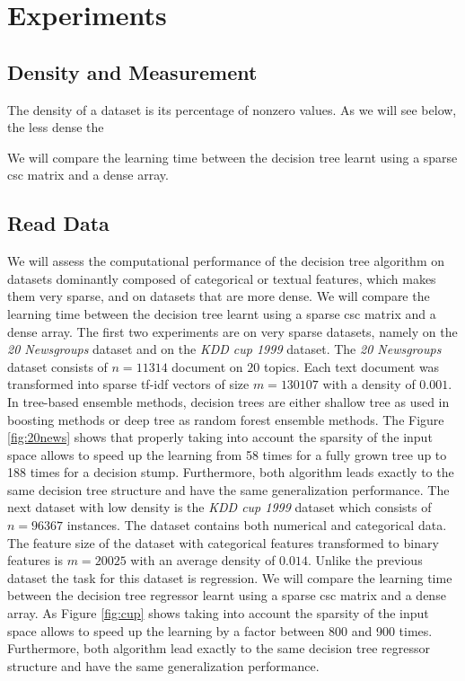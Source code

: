 \section{Experiments} \label{sec:experiments}
\subsection{Density and Measurement}

The density of a dataset is its percentage of nonzero values. As we will see below, the less dense the 

We will compare the learning time between the decision tree learnt
using a sparse csc matrix and a dense array.

\subsection{Read Data}

We will assess the computational performance of the decision tree algorithm on datasets dominantly composed of categorical or textual features, which makes them very sparse, and on datasets that are more dense. We will compare the learning time between the decision tree learnt
using a sparse csc matrix and a dense array.
The first two experiments are on very sparse datasets, namely on the \emph{20 Newsgroups} dataset \cite{joachims1996probabilistic} and on the \emph{KDD cup 1999} dataset\cite{bay2000archive}. The \emph{20 Newsgroups} dataset
consists of $n=11314$ document on $20$ topics. Each text document was
transformed into sparse tf-idf vectors of size $m=130107$ with a density of
$0.001$. 
In tree-based ensemble methods, decision trees are either shallow tree as used
in boosting methods or deep tree as random forest ensemble methods. The Figure
\ref{fig:20news} shows that properly taking into account the sparsity of the
input space allows to speed up the learning from 58 times for a fully grown
tree up to 188 times for a decision stump. Furthermore, both algorithm leads
exactly to the same decision tree structure and have the same generalization
performance. The next dataset with low density is the \emph{KDD cup 1999} dataset which consists of $n=96367$ instances. The dataset contains both numerical and categorical data. The feature size of the dataset with categorical features transformed to binary features is $m=20025$ with an average density of
$0.014$. Unlike the previous dataset the task for this dataset is regression. We will compare the learning time between the decision tree regressor learnt
using a sparse csc matrix and a dense array. As Figure \ref{fig:cup} shows taking into account the sparsity of the
input space allows to speed up the learning by a factor between 800 and 900 times. Furthermore, both algorithm lead
exactly to the same decision tree regressor structure and have the same generalization
performance.

